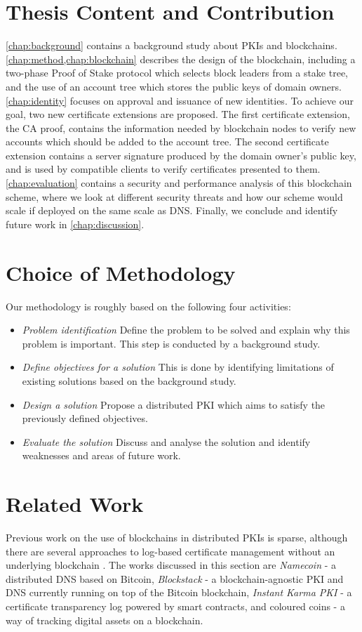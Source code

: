 \documentclass{style/kththesis}
\begin{document}
\section{Thesis Content and Contribution}
\cref{chap:background} contains a background study about PKIs and blockchains. \cref{chap:method,chap:blockchain} describes the design of the blockchain, including a two-phase Proof of Stake protocol which selects block leaders from a stake tree, and the use of an account tree which stores the public keys of domain owners. \cref{chap:identity} focuses on approval and issuance of new identities. To achieve our goal, two new certificate extensions are proposed. The first certificate extension, the CA proof, contains the information needed by blockchain nodes to verify new accounts which should be added to the account tree. The second certificate extension contains a server signature produced by the domain owner's public key, and is used by compatible clients to verify certificates presented to them. \cref{chap:evaluation} contains a security and performance analysis of this blockchain scheme, where we look at different security threats and how our scheme would scale if deployed on the same scale as DNS. Finally, we conclude and identify future work in \cref{chap:discussion}.

\section{Choice of Methodology}
Our methodology is roughly based on the following four activities:
\begin{itemize}
    \item \textit{Problem identification} Define the problem to be solved and explain why this problem is important. This step is conducted by a background study. 
    \item \textit{Define objectives for a solution} This is done by identifying limitations of existing solutions based on the background study.
    \item \textit{Design a solution} Propose a distributed PKI which aims to satisfy the previously defined objectives.
    \item \textit{Evaluate the solution} Discuss and analyse the solution and identify weaknesses and areas of future work.
\end{itemize}

\section{Related Work}
Previous work on the use of blockchains in distributed PKIs is sparse, although there are several approaches to log-based certificate management without an underlying blockchain \cite{Basin14, Kim13, Yu14, RFC6962}. The works discussed in this section are \emph{Namecoin} - a distributed DNS based on Bitcoin, \emph{Blockstack} - a blockchain-agnostic PKI and DNS currently running on top of the Bitcoin blockchain, \emph{Instant Karma PKI} - a certificate transparency log powered by smart contracts, and coloured coins - a way of tracking digital assets on a blockchain.
\end{document}
